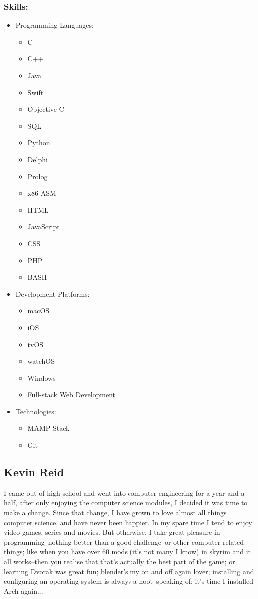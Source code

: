 \documentclass[12pt]{article}
\begin{document}
	\subsubsection{Skills:}
	\begin{itemize}
	\item Programming Languages:
	\begin{itemize}
	\item C
	\item C++
	\item Java
	\item Swift
	\item Objective-C
	\item SQL
	\item Python
	\item Delphi
	\item Prolog
	\item x86 ASM
	\item HTML
	\item JavaScript
	\item CSS
	\item PHP
	\item BASH
	\end{itemize}
	\item Development Platforms:
	\begin{itemize}
	\item macOS
	\item iOS
	\item tvOS
	\item watchOS
	\item Windows
	\item Full-stack Web Development
	\end{itemize}
	\item Technologies:
	\begin{itemize}
	\item MAMP Stack
	\item Git
	\end{itemize}
	\end{itemize}
	
	\subsection{Kevin Reid}
	I came out of high school and went into computer engineering for a year and a half, after only enjoying the computer science modules, I decided it was time to make a change. Since that change, I have grown to love almost all things computer science, and have never been happier.\newline
	In my spare time I tend to enjoy video games, series and movies. But otherwise, I take great pleasure in programming--nothing better than a good challenge--or other computer related things; like when you have over 60 mods (it's not many I know) in skyrim and it all works--then you realise that that's actually the best part of the game; or learning Dvorak was great fun; blender's my on and off again lover; installing and configuring an operating system is always a hoot--speaking of: it's time I installed Arch again...
	
\end{document}
